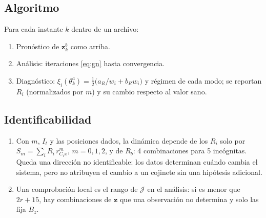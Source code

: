 \subsection{Algoritmo}

Para cada instante $k$ dentro de un archivo:
\begin{enumerate}
\item Pronóstico de $\mathbf z^b_k$ como arriba.
\item Análisis: iteraciones \eqref{eq:gn} hasta convergencia.
\item Diagnóstico: $\xi_i(\theta^a_k)=\tfrac12\big(a_R/w_i+b_Rw_i\big)$ y régimen de cada modo; se reportan $R_i$ (normalizados por $m$) y su cambio respecto al valor sano.
\end{enumerate}

\subsection{Identificabilidad}

\begin{enumerate}
\item Con $m$, $I_t$ y las posiciones dados, la dinámica depende de los $R_i$ solo por $S_m=\sum_iR_i\,r_{C_ix}^m$, $m=0,1,2$, y de $R_b$: 4 combinaciones para 5 incógnitas. Queda una dirección no identificable: los datos determinan cuándo cambia el sistema, pero no atribuyen el cambio a un cojinete sin una hipótesis adicional.
\item Una comprobación local es el rango de $\mathcal J$ en el análisis: si es menor que $2r+15$, hay combinaciones de $\mathbf z$ que una observación no determina y solo las fija $B_z$.
\end{enumerate}
